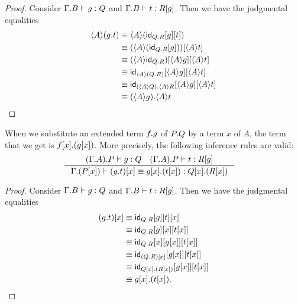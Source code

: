 \begin{proof}
Consider $\jterm{{\Gamma}{B}}{Q}{g}$ and $\jterm{{\Gamma}{B}}{\subst{g}{R}}{t}$.
Then we have the judgmental equalities
\begin{align*}
\ctxwk{A}{\ctxext{g}{t}}
& \jdeq \ctxwk{A}{\subst{t}{{g}{\idfunc[\ctxext{Q}{R}]}}}\\
& \jdeq \subst{\ctxwk{A}{t}}{\ctxwk{A}{\subst{g}{\idfunc[\ctxext{Q}{R}]}}}\\
& \jdeq \subst{\ctxwk{A}{t}}{{\ctxwk{A}{g}}{\ctxwk{A}{\idfunc[\ctxext{Q}{R}]}}}\\
& \jdeq \subst{\ctxwk{A}{t}}{{\ctxwk{A}{g}}{\idfunc[\ctxwk{A}{\ctxext{Q}{R}}]}}\\
& \jdeq \subst{\ctxwk{A}{t}}{{\ctxwk{A}{g}}{\idfunc[\ctxext{\ctxwk{A}{Q}}{\ctxwk{A}{R}}]}}\\
& \jdeq \ctxext{\ctxwk{A}{g}}{\ctxwk{A}{t}}
\end{align*}
\end{proof}

\begin{lem}
When we substitute an extended term $\ctxext{f}{g}$ of $\ctxext{P}{Q}$ by a term
$x$ of $A$, the term that we get is $\ctxext{\subst{x}{f}}{\subst{x}{g}}$.
More precisely, the following inference rules are valid:
\begin{align*}
& \inference
  {\jterm{{{\Gamma}{A}}{P}}{Q}{g}
   \jterm{{{\Gamma}{A}}{P}}{\subst{g}{R}}{t}}
  {\jtermeq
    {{\Gamma}{\subst{x}{P}}}
    {\ctxext{\subst{x}{Q}}{\subst{x}{R}}}
    {\subst{x}{\ctxext{g}{t}}}
    {\ctxext{\subst{x}{g}}{\subst{x}{t}}}}
\end{align*}
\end{lem}

\begin{proof}
Consider $\jterm{{\Gamma}{B}}{Q}{g}$ and $\jterm{{\Gamma}{B}}{\subst{g}{R}}{t}$.
Then we have the judgmental equalities
\begin{align*}
\subst{x}{\ctxext{g}{t}}
& \jdeq \subst{x}{{t}{{g}{\idfunc[\ctxext{Q}{R}]}}}\\
& \jdeq \subst{{x}{t}}{{x}{{g}{\idfunc[\ctxext{Q}{R}]}}}\\
& \jdeq \subst{{x}{t}}{{{x}{g}}{{x}{\idfunc[\ctxext{Q}{R}]}}}\\
& \jdeq \subst{{x}{t}}{{{x}{g}}{\idfunc[\subst{x}{\ctxext{Q}{R}}]}}\\
& \jdeq \subst{{x}{t}}{{{x}{g}}{\idfunc[\ctxext{\subst{x}{Q}}{\subst{x}{R}}]}}\\
& \jdeq \ctxext{\subst{x}{g}}{\subst{x}{t}}.
\end{align*}
\end{proof}


